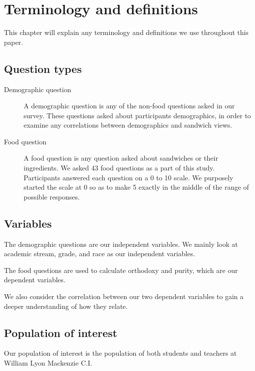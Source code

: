 \chapter{Terminology and definitions}

This chapter will explain any terminology and definitions we use throughout this paper.

\section{Question types}
\begin{description}
	\item[Demographic question] A demographic question is any of the non-food questions asked in our survey. These questions asked about participants demographics, in order to examine any correlations between demographics and sandwich views.
	\item[Food question] A food question is any question asked about sandwiches or their ingredients. We asked 43 food questions as a part of this study. Participants answered each question on a 0 to 10 scale. We purposely started the scale at 0 so as to make 5 exactly in the middle of the range of possible responses.
\end{description}

\section{Variables}
The demographic questions are our independent variables.
We mainly look at academic stream, grade, and race as our independent variables.

The food questions are used to calculate orthodoxy and purity, which are our dependent variables.

We also consider the correlation between our two dependent variables to gain a deeper understanding of how they relate.

\section{Population of interest}
Our population of interest is the population of both students and teachers at William Lyon Mackenzie C.I.
